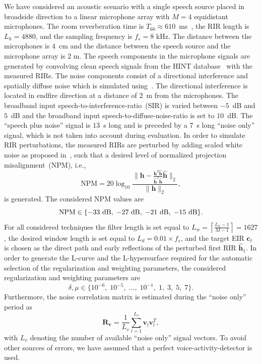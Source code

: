 \documentclass{aes60i}
\begin{document}
We have considered an acoustic scenario with a single speech source placed in broadside direction to a linear microphone array with $M=4$ equidistant microphones.
The room reverberation time is $T_{60} \approx 610$~ms~\cite{hadad_IWAENC_2014}, the RIR length is $L_h = 4880$, and the sampling frequency is $f_s = 8$ kHz.
The distance between the microphones is $4$~cm and the distance between the speech source and the microphone array is $2$ m.
The speech components in the microphone signals are generated by convolving clean speech signals from the HINT database~\cite{Nilsson_JASA_1994} with the measured RIRs.
The noise components consist of a directional interference and spatially diffuse noise which is simulated using~\cite{Habets2008}.
The directional interference is located in endfire direction at a distance of $2$~m from the microphones.
The broadband input speech-to-interference-ratio~(SIR) is varied between $-5$~dB and $5$~dB and the broadband input speech-to-diffuse-noise-ratio is set to $10$~dB.
The ``speech plus noise'' signal is $13$~s long and is preceded by a $7$~s long ``noise only'' signal, which is not taken into account during evaluation.
\newline
In order to simulate RIR perturbations, the measured RIRs are perturbed by adding scaled white noise as proposed in~\cite{Zhang_HINDAWI_2008}, such that a desired level of normalized projection misalignment~(NPM), i.e.,
\begin{equation}
{\text{NPM}} = 20 \log_{10} \frac{\| \mathbf{h} - \frac{\mathbf{h}^T\hat{\mathbf{h}}}{\hat{\mathbf{h}}^T\hat{\mathbf{h}}}\hat{\mathbf{h}}\|_2}{\| \mathbf{h} \|_2},
\end{equation}
is generated.
The considered NPM values are
\begin{equation}
\label{eq: npm}
{\text{NPM}} \in \{ -33~{\rm{dB}}, \; -27~{\rm{dB}}, \; -21~{\rm{dB}}, \; -15~{\rm{dB}} \}. 
\end{equation}
For all considered techniques the filter length is set equal to $L_w = \left\lceil{\frac{L_h-1}{M-1}}\right\rceil =  1627$, the desired window length is set equal to $L_d = 0.01 \times f_s$, and the target EIR $\mathbf{c}_t$ is chosen as the direct path and early reflections of the perturbed first RIR $\hat{\mathbf{h}}_1$.
In order to generate the L-curve and the L-hypersurface required for the automatic selection of the regularization and weighting parameters, the considered regularization and weighting parameters are
\begin{equation}
\delta, \mu \in \{ 10^{-6}, \; 10^{-5}, \; \ldots, \; 10^{-1}, \; 1, \; 3, \; 5, \; 7 \}.
\end{equation}
Furthermore, the noise correlation matrix is estimated during the ``noise only'' period as
\begin{equation}
\label{eq: corrdiff}
\mathbf{R}_{\mathbf{v}} = \frac{1}{L_v} \sum_{l = 1}^{L_v} \mathbf{v}^{}_l \mathbf{v}^T_l,
\end{equation}
with $L_v$ denoting the number of available ``noise only'' signal vectors.
To avoid other sources of errors, we have assumed that a perfect voice-activity-detector is used.
\end{document}
